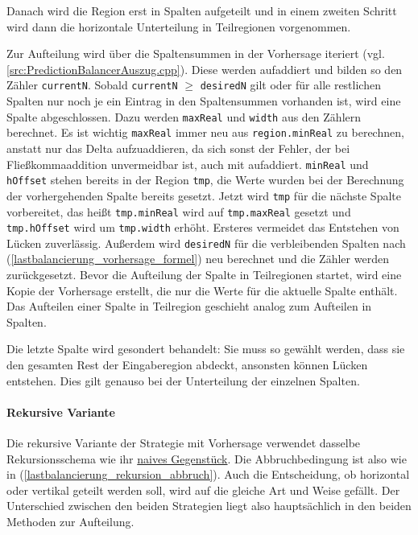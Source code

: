 Danach wird die Region erst in Spalten aufgeteilt und in einem zweiten Schritt wird dann die horizontale Unterteilung in Teilregionen vorgenommen.

Zur Aufteilung wird über die Spaltensummen in der Vorhersage iteriert (vgl. \autoref{src:PredictionBalancerAuszug.cpp}). Diese werden aufaddiert und bilden so den Zähler \verb|currentN|.
Sobald \verb|currentN| $\geq$ \verb|desiredN| gilt oder für alle restlichen Spalten nur noch je ein Eintrag in den Spaltensummen vorhanden ist, wird eine Spalte abgeschlossen.
Dazu werden \verb|maxReal| und \verb|width| aus den Zählern berechnet. Es ist wichtig \verb|maxReal| immer neu aus \verb|region.minReal| zu berechnen, anstatt nur das Delta aufzuaddieren, da sich sonst der Fehler, der bei Fließkommaaddition unvermeidbar ist, auch mit aufaddiert. \verb|minReal| und \verb|hOffset| stehen bereits in der Region \verb|tmp|, die Werte wurden bei der Berechnung der vorhergehenden Spalte bereits gesetzt.
Jetzt wird \verb|tmp| für die nächste Spalte vorbereitet, das heißt \verb|tmp.minReal| wird auf \verb|tmp.maxReal| gesetzt und \verb|tmp.hOffset| wird um \verb|tmp.width| erhöht. Ersteres vermeidet das Entstehen von Lücken zuverlässig.
Außerdem wird \verb|desiredN| für die verbleibenden Spalten nach (\ref{lastbalancierung_vorhersage_formel}) neu berechnet und die Zähler werden zurückgesetzt.
Bevor die Aufteilung der Spalte in Teilregionen startet, wird eine Kopie der Vorhersage erstellt, die nur die Werte für die aktuelle Spalte enthält.
Das Aufteilen einer Spalte in Teilregion geschieht analog zum Aufteilen in Spalten.

Die letzte Spalte wird gesondert behandelt: Sie muss so gewählt werden, dass sie den gesamten Rest der Eingaberegion abdeckt, ansonsten können Lücken entstehen.
Dies gilt genauso bei der Unterteilung der einzelnen Spalten.

\begin{figure}
	
\end{figure}

\paragraph*{Rekursive Variante}
Die rekursive Variante der Strategie mit Vorhersage verwendet dasselbe Rekursionsschema wie ihr \hyperref[lastbalancierung_naiv_rekursion]{naives Gegenstück}.
Die Abbruchbedingung ist also wie in (\ref{lastbalancierung_rekursion_abbruch}).
Auch die Entscheidung, ob horizontal oder vertikal geteilt werden soll, wird auf die gleiche Art und Weise gefällt.
Der Unterschied zwischen den beiden Strategien liegt also hauptsächlich in den beiden Methoden zur Aufteilung.

